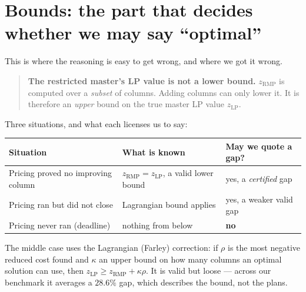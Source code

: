 \documentclass[11pt,a4paper]{article}
\newcommand{\ub}{\overline{z}}
\begin{document}
\section{Bounds: the part that decides whether we may say ``optimal''}

This is where the reasoning is easy to get wrong, and where we got it wrong.

\begin{quote}
\textbf{The restricted master's LP value is not a lower bound.}
$z_{\mathrm{RMP}}$ is computed over a \emph{subset} of columns. Adding columns
can only lower it. It is therefore an \emph{upper} bound on the true master LP
value $z_{\mathrm{LP}}$.
\end{quote}

Three situations, and what each licenses us to say:

\begin{center}\small
\begin{tabular}{@{}p{4.5cm}p{5.3cm}p{3.3cm}@{}}
\toprule
Situation & What is known & May we quote a gap? \\
\midrule
Pricing proved no improving column & $z_{\mathrm{RMP}} = z_{\mathrm{LP}}$, a valid lower bound & yes, a \emph{certified} gap \\
Pricing ran but did not close & Lagrangian bound applies & yes, a weaker valid gap \\
Pricing never ran (deadline) & nothing from below & \textbf{no} \\
\bottomrule
\end{tabular}
\end{center}

The middle case uses the Lagrangian (Farley) correction: if $\rho$ is the most
negative reduced cost found and $\kappa$ an upper bound on how many columns an
optimal solution can use, then
$z_{\mathrm{LP}} \geq z_{\mathrm{RMP}} + \kappa\rho$.
It is valid but loose --- across our benchmark it averages a $28.6\%$ gap, which
describes the bound, not the plans.

\begin{center}
\end{center}
\end{document}
